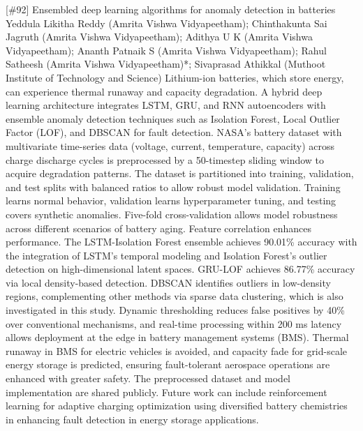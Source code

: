 {} \begin{abstract_online} {[\#92] Ensembled deep learning algorithms for anomaly detection in batteries} {} {Yeddula  Likitha Reddy (Amrita Vishwa Vidyapeetham); Chinthakunta Sai Jagruth (Amrita Vishwa Vidyapeetham); Adithya  U K (Amrita Vishwa Vidyapeetham); Ananth Patnaik S (Amrita Vishwa Vidyapeetham); Rahul  Satheesh (Amrita Vishwa Vidyapeetham)*; Sivaprasad Athikkal (Muthoot Institute of Technology and Science)} {} Lithium-ion batteries, which store energy, can experience thermal runaway and capacity degradation. A hybrid deep learning architecture integrates LSTM, GRU, and RNN autoencoders with ensemble anomaly detection techniques such as Isolation Forest, Local Outlier Factor (LOF), and DBSCAN for fault detection. NASA's battery dataset with multivariate time-series data (voltage, current, temperature, capacity) across charge discharge cycles is preprocessed by a 50-timestep sliding window to acquire degradation patterns. The dataset is partitioned into training, validation, and test splits with balanced ratios to allow robust model validation. Training learns normal behavior, validation learns hyperparameter tuning, and testing covers synthetic anomalies. Five-fold cross-validation allows model robustness across different scenarios of battery aging. Feature correlation enhances performance. The LSTM-Isolation Forest ensemble achieves 90.01\% accuracy with the integration of LSTM's temporal modeling and Isolation Forest's outlier detection on high-dimensional latent spaces. GRU-LOF achieves 86.77\% accuracy via local density-based detection. DBSCAN identifies outliers in low-density regions, complementing other methods via sparse data clustering, which is also investigated in this study. Dynamic thresholding reduces false positives by 40\% over conventional mechanisms, and real-time processing within 200 ms latency allows deployment at the edge in battery management systems (BMS). Thermal runaway in BMS for electric vehicles is avoided, and capacity fade for grid-scale energy storage is predicted, ensuring fault-tolerant aerospace operations are enhanced with greater safety. The preprocessed dataset and model implementation are shared publicly. Future work can include reinforcement learning for adaptive charging optimization using diversified battery chemistries in enhancing fault detection in energy storage applications. \end{abstract_online} 
